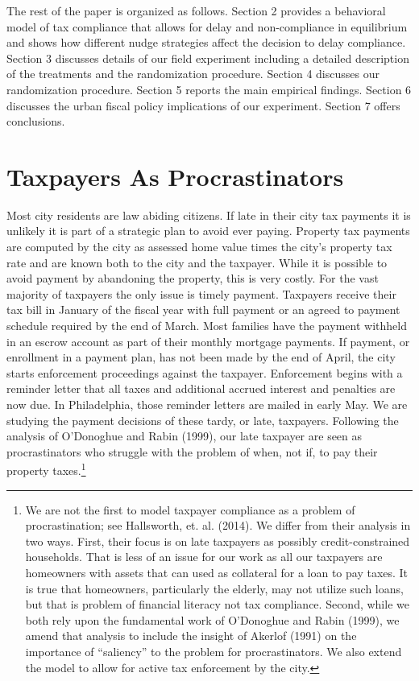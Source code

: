 \documentclass[12pt]{article}
\newcommand{\TAG}[1]{}
\begin{document}
The rest of the paper is organized as follows.  Section 2 provides a
behavioral model of tax compliance that allows for delay and
non-compliance in equilibrium and shows how different nudge strategies
affect the decision to delay compliance. Section 3 discusses details
of our field experiment including a detailed description of the
treatments and the randomization procedure. Section 4 discusses our
randomization procedure.  Section 5 reports the main empirical
findings. Section 6 discusses the urban fiscal policy implications of our 
experiment. Section 7 offers conclusions.

\TAG{END_INTRO}

\TAG{BEGIN_BODY}

\section{Taxpayers As Procrastinators}

Most city residents are law abiding citizens.  If late in their city
tax payments it is unlikely it is part of a strategic plan to avoid
ever paying.  Property tax payments are computed by the city as assessed
home value times the city's property tax rate and are known both to
the city and the taxpayer.  While it is possible to avoid payment by
abandoning the property, this is very costly.  For the vast majority
of taxpayers the only issue is timely payment.  Taxpayers receive
their tax bill in January of the fiscal year with full payment or an
agreed to payment schedule required by the end of March.  Most
families have the payment withheld in an escrow account as part of
their monthly mortgage payments.  If payment, or enrollment in a
payment plan, has not been made by the end of April, the city starts
enforcement proceedings against the taxpayer.  Enforcement begins with
a reminder letter that all taxes and additional accrued interest and
penalties are now due.  In Philadelphia, those reminder letters are
mailed in early May.  We are studying the payment decisions of these
tardy, or late, taxpayers. Following the analysis of O'Donoghue
and Rabin (1999), our late taxpayer are seen as procrastinators who
struggle with the problem of when, not if, to pay their property
taxes.\footnote{We are not the first to model taxpayer compliance as a
  problem of procrastination; see Hallsworth, et. al.  (2014). We
  differ from their analysis in two ways.  First, their focus is on
  late taxpayers as possibly credit-constrained households.  That is
  less of an issue for our work as all our taxpayers are homeowners
  with assets that can used as collateral for a loan to pay taxes.  It
  is true that homeowners, particularly the elderly, may not utilize
  such loans, but that is problem of financial literacy not tax
  compliance.  Second, while we both rely upon the fundamental work of
  O'Donoghue and Rabin (1999), we amend that analysis to include the
  insight of Akerlof (1991) on the importance of ``saliency'' to the
  problem for procrastinators. We also extend the model to allow for
  active tax enforcement by the city.}
\end{document}
